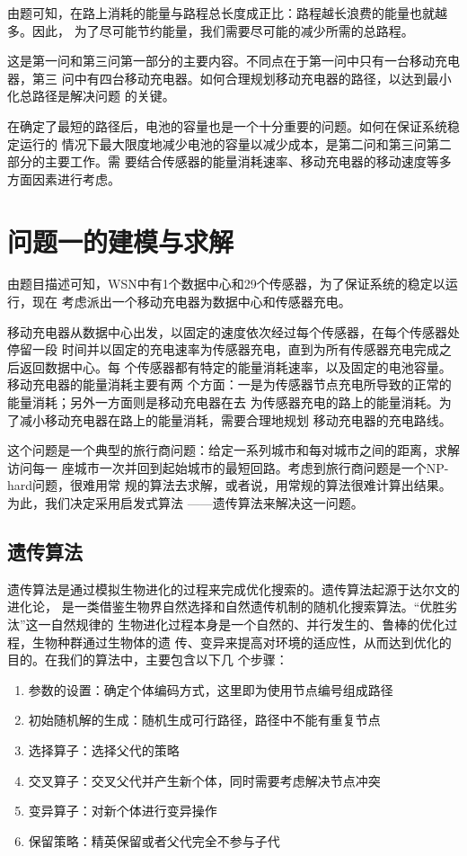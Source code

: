 \documentclass{ctexart}
\begin{document}
    由题可知，在路上消耗的能量与路程总长度成正比：路程越长浪费的能量也就越多。因此，
    为了尽可能节约能量，我们需要尽可能的减少所需的总路程。

    这是第一问和第三问第一部分的主要内容。不同点在于第一问中只有一台移动充电器，第三
    问中有四台移动充电器。如何合理规划移动充电器的路径，以达到最小化总路径是解决问题
    的关键。

    在确定了最短的路径后，电池的容量也是一个十分重要的问题。如何在保证系统稳定运行的
    情况下最大限度地减少电池的容量以减少成本，是第二问和第三问第二部分的主要工作。需
    要结合传感器的能量消耗速率、移动充电器的移动速度等多方面因素进行考虑。


    \section{问题一的建模与求解}
    由题目描述可知，WSN中有1个数据中心和29个传感器，为了保证系统的稳定以运行，现在
    考虑派出一个移动充电器为数据中心和传感器充电。

    移动充电器从数据中心出发，以固定的速度依次经过每个传感器，在每个传感器处停留一段
    时间并以固定的充电速率为传感器充电，直到为所有传感器充电完成之后返回数据中心。每
    个传感器都有特定的能量消耗速率，以及固定的电池容量。移动充电器的能量消耗主要有两
    个方面：一是为传感器节点充电所导致的正常的能量消耗；另外一方面则是移动充电器在去
    为传感器充电的路上的能量消耗。为了减小移动充电器在路上的能量消耗，需要合理地规划
    移动充电器的充电路线。

    这个问题是一个典型的旅行商问题：给定一系列城市和每对城市之间的距离，求解访问每一
    座城市一次并回到起始城市的最短回路。考虑到旅行商问题是一个NP-hard问题，很难用常
    规的算法去求解，或者说，用常规的算法很难计算出结果。为此，我们决定采用启发式算法
    ——遗传算法来解决这一问题。

    \subsection{遗传算法}
    遗传算法是通过模拟生物进化的过程来完成优化搜索的。遗传算法起源于达尔文的进化论，
    是一类借鉴生物界自然选择和自然遗传机制的随机化搜索算法。“优胜劣汰”这一自然规律的
    生物进化过程本身是一个自然的、并行发生的、鲁棒的优化过程，生物种群通过生物体的遗
    传、变异来提高对环境的适应性，从而达到优化的目的。在我们的算法中，主要包含以下几
    个步骤：
    \begin{enumerate}[a]
        \item 参数的设置：确定个体编码方式，这里即为使用节点编号组成路径
        \item 初始随机解的生成：随机生成可行路径，路径中不能有重复节点
        \item 选择算子：选择父代的策略
        \item 交叉算子：交叉父代并产生新个体，同时需要考虑解决节点冲突
        \item 变异算子：对新个体进行变异操作
        \item 保留策略：精英保留或者父代完全不参与子代
    \end{enumerate}
\end{document}
